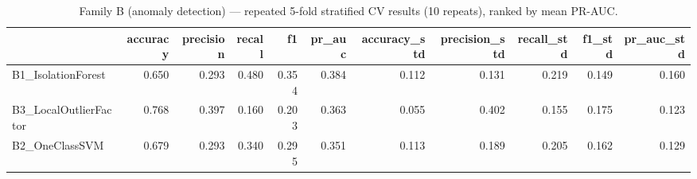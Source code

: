\begin{table}[htbp]
\caption{Family B (anomaly detection) — repeated 5-fold stratified CV results (10 repeats), ranked by mean PR-AUC.}
\label{tab:family_b_cv_summary}
\begin{tabular}{lrrrrrrrrrr}
\toprule
 & accuracy & precision & recall & f1 & pr\_auc & accuracy\_std & precision\_std & recall\_std & f1\_std & pr\_auc\_std \\
\midrule
B1\_IsolationForest & 0.650 & 0.293 & 0.480 & 0.354 & 0.384 & 0.112 & 0.131 & 0.219 & 0.149 & 0.160 \\
B3\_LocalOutlierFactor & 0.768 & 0.397 & 0.160 & 0.203 & 0.363 & 0.055 & 0.402 & 0.155 & 0.175 & 0.123 \\
B2\_OneClassSVM & 0.679 & 0.293 & 0.340 & 0.295 & 0.351 & 0.113 & 0.189 & 0.205 & 0.162 & 0.129 \\
\bottomrule
\end{tabular}
\end{table}
